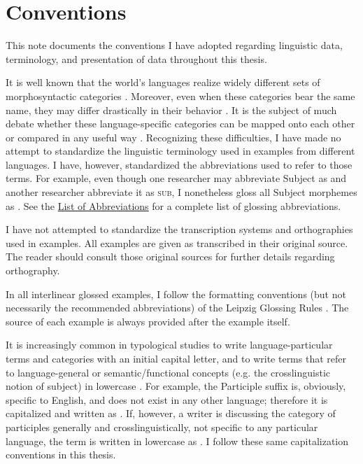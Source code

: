 \section*{Conventions}
\label{sec:conventions}

This note documents the conventions I have adopted regarding linguistic data, terminology, and presentation of data throughout this thesis.


It is well known that the world's languages realize widely different sets of morphosyntactic categories \parencites[58]{Whaley1997}{Haspelmath2007}. Moreover, even when these categories bear the same name, they may differ drastically in their behavior \parencite[9]{Dixon2010}. It is the subject of much debate whether these language-specific categories can be mapped onto each other or compared in any useful way \parencites{Croft1995}[10--15]{Song2001}[13--19]{Croft2003}{Haspelmath2010a}{Haspelmath2010c}{Newmeyer2010}{Stassen2011}[308--310]{Hieber2013}{Croft2014}{Plank2016}[44--58]{Song2018}. Recognizing these difficulties, I have made no attempt to standardize the linguistic terminology used in examples from different languages. I have, however, standardized the abbreviations used to refer to those terms. For example, even though one researcher may abbreviate Subject as  and another researcher abbreviate it as \textsc{sub}, I nonetheless gloss all Subject morphemes as . See the \hyperref[ch:abbreviations]{List of Abbreviations} for a complete list of glossing abbreviations.

I have not attempted to standardize the transcription systems and orthographies used in examples. All examples are given as transcribed in their original source. The reader should consult those original sources for further details regarding orthography.

In all interlinear glossed examples, I follow the formatting conventions (but not necessarily the recommended abbreviations) of the Leipzig Glossing Rules \parencite{BickelComrieHaspelmath2015}. The source of each example is always provided after the example itself.


It is increasingly common in typological studies to write language-particular terms and categories with an initial capital letter, and to write terms that refer to language-general or semantic/functional concepts (e.g. the crosslinguistic notion of subject) in lowercase \parencites[10]{Comrie1976}[47 (fn. 3), 141]{Bybee1985}[66]{Croft2000}[674]{Haspelmath2010a}[535]{Croft2014}. For example, the  Participle suffix  is, obviously, specific to English, and does not exist in any other language; therefore it is capitalized and written as . If, however, a writer is discussing the category of participles generally and crosslinguistically, not specific to any particular language, the term is written in lowercase as . I follow these same capitalization conventions in this thesis.

